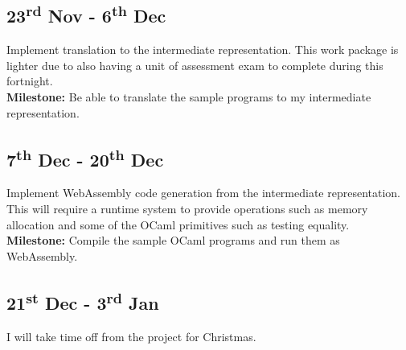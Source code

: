 \documentclass[12pt]{article}
\begin{document}
\subsection*{23\textsuperscript{rd} Nov - 6\textsuperscript{th} Dec}%
Implement translation to the intermediate representation. This work package is lighter due to also having a unit of assessment exam to complete during this fortnight. \\
\textbf{Milestone: }Be able to translate the sample programs to my intermediate representation.



\subsection*{7\textsuperscript{th} Dec - 20\textsuperscript{th} Dec}%
Implement WebAssembly code generation from the intermediate representation. This will require a runtime system to provide operations such as memory allocation and some of the OCaml primitives such as testing equality. \\
\textbf{Milestone: }%
Compile the sample OCaml programs and run them as WebAssembly.

\subsection*{21\textsuperscript{st} Dec - 3\textsuperscript{rd} Jan}%
I will take time off from the project for Christmas. 

\end{document}
